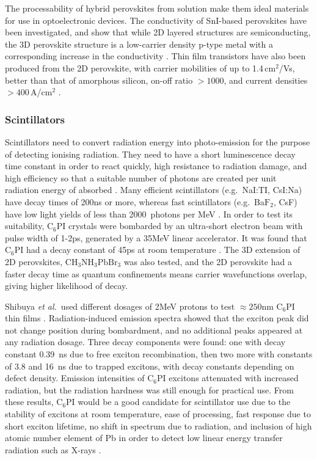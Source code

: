 The processability of hybrid perovskites from solution make them ideal materials for use in optoelectronic devices. The conductivity of SnI-based perovskites have been investigated, and show that while 2D layered structures are semiconducting, the 3D perovskite structure is a low-carrier density p-type metal with a corresponding increase in the conductivity \cite{Mitzi1994}. Thin film transistors have also been produced from the 2D perovskite, with carrier mobilities of up to 1.4\,cm$^2$/Vs, better than that of amorphous silicon, on-off ratio $>1000$, and current densities $>400$\,A/cm$^2$ \cite{Mitzi2002b, Mitzi2001d, Kagan199a}.

\subsubsection{Scintillators}
Scintillators need to convert radiation energy into photo-emission for the purpose of detecting ionising radiation. They need to have a short luminescence decay time constant in order to react quickly, high resistance to radiation damage, and high efficiency so that a suitable number of photons are created per unit radiation energy of absorbed \cite{Shibuya2002}. Many efficient scintillators (e.g.\ NaI:TI, CsI:Na) have decay times of 200ns or more, whereas fast scintillators (e.g.\ Ba$\textrm{F}_2$, CsF) have low light yields of less than 2000~photons per MeV \cite{Kengo2002}. In order to test its suitability, $\textrm{C}_6$PI crystals were bombarded by an ultra-short electron beam with pulse width of 1-2ps, generated by a 35MeV linear accelerator. It was found that $\textrm{C}_6$PI had a decay constant of 45ps at room temperature \cite{Kengo2002}. The 3D extension of 2D perovskites, $\textrm{CH}_3\textrm{NH}_3\textrm{PbBr}_3$ was also tested, and the 2D perovskite had a faster decay time as quantum confinements means carrier wavefunctions overlap, giving higher likelihood of decay.

Shibuya \textit{et al.}\ used different dosages of 2MeV protons to test $\approx250$nm $\textrm{C}_6$PI thin films \cite{Shibuya2002}. Radiation-induced emission spectra showed that the exciton peak did not change position during bombardment, and no additional peaks appeared at any radiation dosage. Three decay components were found: one with decay constant 0.39~ns due to free exciton recombination, then two more with constants of 3.8 and 16~ns due to trapped excitons, with decay constants depending on defect density. Emission intensities of $\textrm{C}_6$PI excitons attenuated with increased radiation, but the radiation hardness was still enough for practical use. From these results, $\textrm{C}_6$PI would be a good candidate for scintillator use due to the stability of excitons at room temperature, ease of processing, fast response due to short exciton lifetime, no shift in spectrum due to radiation, and inclusion of high atomic number element of Pb in order to detect low linear energy transfer radiation such as X-rays \cite{Shibuya2004}. 

